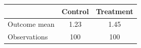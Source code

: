 \begin{tabular}{lcc}
\toprule
 & Control & Treatment \\
\midrule
Outcome mean & 1.23 & 1.45 \\
Observations & 100 & 100 \\
\bottomrule
\end{tabular}
